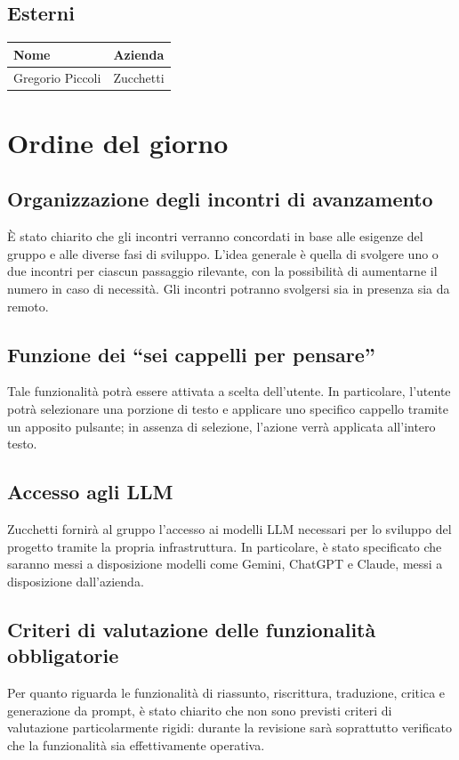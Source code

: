 \documentclass[a4paper, 10pt, colorlinks=true, linkcolor=black, urlcolor=blue, citecolor=blue, hidelinks]{article}
\begin{document}
\subsection{Esterni}

\begin{center}
\begin{tabular}{|l|l|}
\hline
\textbf{Nome} & \textbf{Azienda} \\
\hline
Gregorio Piccoli & Zucchetti \\
\hline
\end{tabular}
\end{center}

\section{Ordine del giorno}

\subsection{Organizzazione degli incontri di avanzamento}
È stato chiarito che gli incontri verranno concordati in base alle esigenze del gruppo e alle diverse fasi di sviluppo. L'idea generale è quella di svolgere uno o due incontri per ciascun passaggio rilevante, con la possibilità di aumentarne il numero in caso di necessità. Gli incontri potranno svolgersi sia in presenza sia da remoto.

\subsection{Funzione dei ``sei cappelli per pensare''}
Tale funzionalità potrà essere attivata a scelta dell'utente. In particolare, l'utente potrà selezionare una porzione di testo e applicare uno specifico cappello tramite un apposito pulsante; in assenza di selezione, l'azione verrà applicata all'intero testo.

\subsection{Accesso agli LLM}
Zucchetti fornirà al gruppo l'accesso ai modelli LLM necessari per lo sviluppo del progetto tramite la propria infrastruttura. In particolare, è stato specificato che saranno messi a disposizione modelli come Gemini, ChatGPT e Claude, messi a disposizione dall'azienda.

\subsection{Criteri di valutazione delle funzionalità obbligatorie}
Per quanto riguarda le funzionalità di riassunto, riscrittura, traduzione, critica e generazione da prompt, è stato chiarito che non sono previsti criteri di valutazione particolarmente rigidi: durante la revisione sarà soprattutto verificato che la funzionalità sia effettivamente operativa.
\end{document}
